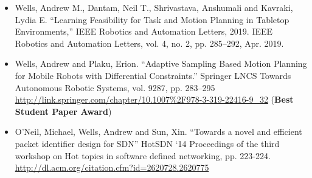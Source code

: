 \begin{itemize}
\vspace{1em} 

\item[]{Wells, Andrew M., Dantam, Neil T., Shrivastava, Anshumali and Kavraki, Lydia E.  “Learning Feasibility for Task and Motion Planning in Tabletop Environments,” IEEE Robotics and Automation Letters, 2019. IEEE Robotics and Automation Letters, vol. 4, no. 2, pp. 285–292, Apr. 2019.}

\vspace{1em} 

\item[]{Wells, Andrew and Plaku, Erion.  “Adaptive Sampling Based Motion Planning for Mobile Robots with Differential Constraints.” Springer LNCS Towards Autonomous Robotic Systems, vol. 9287, pp. 283–295 \url{http://link.springer.com/chapter/10.1007%2F978-3-319-22416-9_32} (\textbf{Best Student Paper Award})}

\vspace{1em} 

\item[]{O’Neil, Michael, Wells, Andrew and Sun, Xin. “Towards a novel and efficient packet identifier design for SDN” HotSDN ‘14 Proceedings of the third workshop on Hot topics in software defined networking, pp. 223-224. \url{http://dl.acm.org/citation.cfm?id=2620728.2620775}}

\end{itemize}